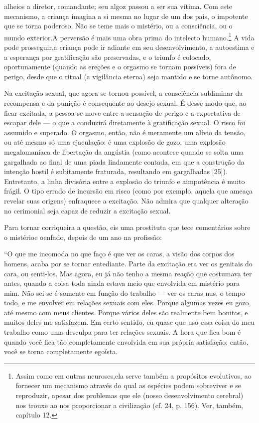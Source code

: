 alheios a diretor, comandante; seu algoz passou a ser sua vítima. Com
este mecanismo, a criança imagina a si mesma no lugar de um dos pais, o
impotente que se torna poderoso. Não se teme mais o mistério, ou a
consciência, ou o mundo exterior.\idxfantareve[|)] A perversão é mais uma obra prima do
intelecto humano.\footnote{ Assim como em outras neuroses,\idxneuro[|nn] ela serve
também a propósitos evolutivos, ao fornecer um mecanismo através do qual
as espécies podem sobreviver e se reproduzir, apesar dos problemas que ele
(nosso desenvolvimento cerebral) nos trouxe ao nos proporcionar a civilização
(cf. 24, p. 156). Ver, também, capítulo 12.}
A vida pode prosseguir,\idxtrauma[|(] a criança pode ir adiante em seu desenvolvimento,
a autoestima e a esperança por gratificação são preservadas, e o triunfo
é colocado, oportunamente (quando as ereções e o orgasmo se tornam possíveis)
fora de perigo, desde que o ritual (a vigilância eterna) seja mantido
e se torne autônomo.

Na excitação sexual, que agora se tornou possível, a consciência
subliminar da recompensa e da punição é consequente ao desejo sexual.
É desse modo que, ao ficar excitada, a pessoa se move entre a sensação\idxperigo{}
de perigo\idxpervexpos{} e a expectativa de escapar dele --- o que a conduzirá
diretamente à gratificação sexual. O risco foi assumido e superado. O\idxpervorgas{}
orgasmo,\idxorgas{} então, não é meramente um alívio da tensão, ou até mesmo só
uma ejaculação: é uma explosão de gozo, uma explosão megalomaníaca de
libertação da angústia (como acontece quando se solta uma gargalhada ao
final de uma piada lindamente contada, em que a construção da intenção
hostil é subitamente fraturada, resultando em gargalhadas [25]).
Entretanto, a linha divisória entre a explosão do triunfo e a\idxtrauma[|)]
impotência é muito frágil. O tipo errado de incursão em risco (como por
exemplo, aquela que ameaça revelar suas origens) enfraquece a
excitação. Não admira que qualquer alteração no cerimonial seja capaz
de reduzir a excitação sexual.

Para tornar corriqueira a questão, eis uma prostituta que tece
comentários sobre o mistério\idxprostenf[|(] e o\idxpervenfad[|(] enfado,\idxenfa{} depois de um ano na profissão:

``O que me incomoda no que faço é que ver os caras, a
visão dos corpos dos homens, acaba por se tornar entediante. Parte da
excitação era ver os genitais do cara, ou senti-los. Mas agora, eu já
não tenho a mesma reação que costumava ter antes, quando a coisa toda
ainda estava meio que envolvida em mistério para mim. Não sei se é
somente em função do trabalho --- ver os caras nus, o tempo todo, e me
envolver em relações sexuais com eles. Porque algumas vezes eu gozo,
até mesmo com meus clientes. Porque vários deles são realmente bem
bonitos, e muitos deles me satisfazem. Em certo sentido, eu quase que
uso essa coisa do meu trabalho como uma desculpa para ter relações
sexuais. A hora que fica bom é quando você fica tão completamente
envolvida em sua própria satisfação; então, você se torna completamente
egoísta.

